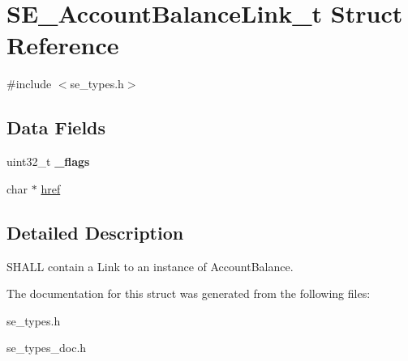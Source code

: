 \hypertarget{structSE__AccountBalanceLink__t}{}\section{S\+E\+\_\+\+Account\+Balance\+Link\+\_\+t Struct Reference}
\label{structSE__AccountBalanceLink__t}


{\ttfamily \#include $<$se\+\_\+types.\+h$>$}

\subsection*{Data Fields}
\begin{DoxyCompactItemize}
\item 
uint32\+\_\+t {\bfseries \+\_\+flags}
\item 
char $\ast$ \hyperlink{group__AccountBalanceLink_ga400d2097dbfecb5780a8067429c01c11}{href}
\end{DoxyCompactItemize}


\subsection{Detailed Description}
S\+H\+A\+LL contain a Link to an instance of Account\+Balance. 

The documentation for this struct was generated from the following files\+:\begin{DoxyCompactItemize}
\item 
se\+\_\+types.\+h\item 
se\+\_\+types\+\_\+doc.\+h\end{DoxyCompactItemize}
